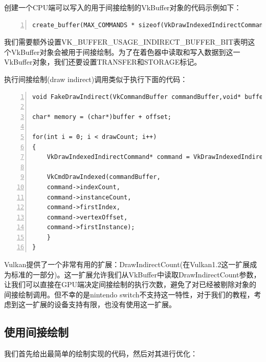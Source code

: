 \documentclass{ctexart}
\begin{document}
创建一个CPU端可以写入的用于间接绘制的VkBuffer对象的代码示例如下：

\begin{lstlisting}[language={[ANSI]C},keywordstyle=\color{blue!70},commentstyle=\color{red!50!green!50!blue!50},frame=shadowbox, rulesepcolor=\color{red!20!green!20!blue!20},basicstyle=\small,numbers=left, numberstyle=\tiny,breaklines=true]
create_buffer(MAX_COMMANDS * sizeof(VkDrawIndexedIndirectCommand),VK_BUFFER_USAGE_TRANSFER_DST_BIT | VK_BUFFER_USAGE_STORAGE_BUFFER_BIT |  VK_BUFFER_USAGE_INDIRECT_BUFFER_BIT, VMA_MEMORY_USAGE_CPU_TO_GPU);
\end{lstlisting}

我们需要额外设置VK\_BUFFER\_USAGE\_INDIRECT\_BUFFER\_BIT表明这个VkBuffer对象会被用于间接绘制。为了在着色器中读取和写入数据到这一VkBuffer对象，我们还要设置TRANSFER和STORAGE标记。

执行间接绘制(draw indirect)调用类似于执行下面的代码：

\begin{lstlisting}[language={[ANSI]C},keywordstyle=\color{blue!70},commentstyle=\color{red!50!green!50!blue!50},frame=shadowbox, rulesepcolor=\color{red!20!green!20!blue!20},basicstyle=\small,numbers=left, numberstyle=\tiny,breaklines=true]
void FakeDrawIndirect(VkCommandBuffer commandBuffer,void* buffer,VkDeviceSize offset, uint32_t drawCount,uint32_t stride);

char* memory = (char*)buffer + offset;

for(int i = 0; i < drawCount; i++)
{
	VkDrawIndexedIndirectCommand* command = VkDrawIndexedIndirectCommand*(memory + (i * stride));

	VkCmdDrawIndexed(commandBuffer, 
	command->indexCount, 
	command->instanceCount, 
	command->firstIndex, 
	command->vertexOffset,
	command->firstInstance);
	}
}   
\end{lstlisting}

Vulkan提供了一个非常有用的扩展：DrawIndirectCount(在Vulkan1.2这一扩展成为标准的一部分)。这一扩展允许我们从VkBuffer中读取DrawIndirectCount参数，让我们可以直接在GPU端决定间接绘制的执行次数，避免了对已经被剔除对象的间接绘制调用。但不幸的是nintendo switch不支持这一特性，对于我们的教程，考虑到这一扩展的设备支持有限，也没有使用这一扩展。

\subsection{使用间接绘制}

我们首先给出最简单的绘制实现的代码，然后对其进行优化：
\end{document}
